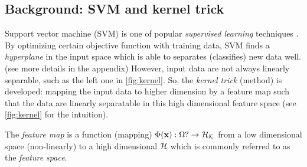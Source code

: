 \subsection{Background: SVM and kernel trick}\label{sec:svm}
Support vector machine (SVM) is one of popular \emph{supervised learning} techniques \cite{cortesSupportvectorNetworks1995}.
By optimizing certain objective function with training data,
SVM finds a \emph{hyperplane} in the input space
which is able to separates (classifies) new data well. (see more details in the appendix)
However, input data are not always linearly separable, such as the left one in \cref{fig:kernel}.
So, the \emph{kernel trick} (method) is developed: mapping the input data to higher dimension by a feature map such that the data are linearly separatable in this high dimensional feature space (see \cref{fig:kernel} for the intuition).
\begin{definition}\label{def:feature_map_classical}
	The \emph{feature map} is a function (mapping) 
	$\Phi(\vb{x}) : \Omega? \to \mathcal{H}_{\mathcal{K}}$
	from a low dimensional space (non-linearly) to a high dimensional  $\mathcal{H}$ which is commonly referred to as the \emph{feature space}.
\end{definition}
